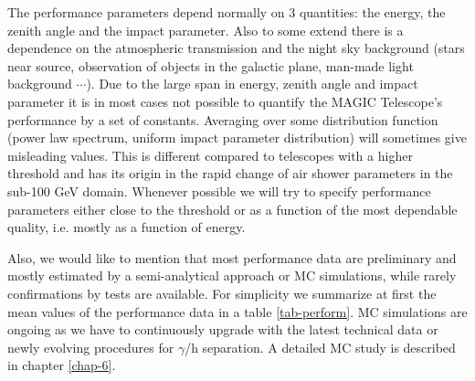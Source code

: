 The performance parameters depend normally on 3 quantities: the energy, the
zenith angle and the impact parameter. Also to some extend there is a
dependence on the atmospheric transmission and the night sky background (stars near source,
observation of objects in the galactic plane, man-made light background $%
\cdots $). Due to the large span in energy, zenith angle and impact
parameter it is in most cases not possible to quantify the MAGIC Telescope's performance
by a set of constants. Averaging over some distribution function (power law
spectrum, uniform impact parameter distribution) will sometimes give
misleading values. This is different compared to telescopes with a higher
threshold and has its origin in the rapid change of air shower parameters in
the sub-100 GeV domain. Whenever possible we will try to specify performance
parameters either close to the threshold or as a function of the most
dependable quality, i.e. mostly as a function of energy.

Also, we would like to mention that most performance data are preliminary
and mostly estimated by a semi-analytical approach or MC simulations, while
rarely confirmations by tests are available. For simplicity we summarize at
first the mean values of the performance data in a table \ref{tab-perform}.
MC simulations are ongoing as we have
to continuously upgrade with the latest technical data or newly evolving
procedures for $\gamma $/h separation. A detailed MC study is described in chapter \ref{chap-6}.

